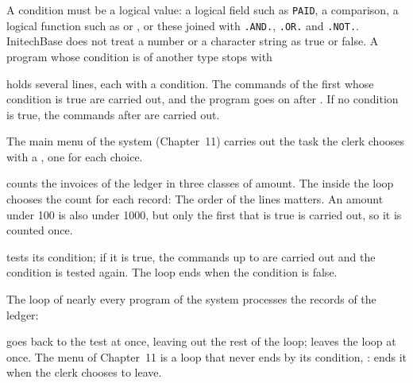 A condition must be a logical value: a logical field such as \texttt{PAID}, a
comparison, a logical function such as  or , or these
joined with \texttt{.AND.}, \texttt{.OR.} and \texttt{.NOT.}.  InitechBase does
not treat a number or a character string as true or false.  A program whose
condition is of another type stops with

 holds several  lines, each with a condition.  The
commands of the first  whose condition is true are carried out, and
the program goes on after .  If no condition is true, the commands
after  are carried out.


The main menu of the system (Chapter~11) carries out the task the clerk
chooses with a , one  for each choice.

 counts the invoices of the ledger in three classes of
amount.  The  inside the loop chooses the count for each record:
The order of the  lines matters.  An amount under 100 is also under
1000, but only the first  that is true is carried out, so it is
counted once.

 tests its condition; if it is true, the commands up to
 are carried out and the condition is tested again.  The loop ends
when the condition is false.


The loop of nearly every program of the system processes the records of the
ledger:


 goes back to the test at once, leaving out the rest of the loop;
 leaves the loop at once.  The menu of Chapter~11 is a loop that
never ends by its condition, :  ends it when the
clerk chooses to leave.

